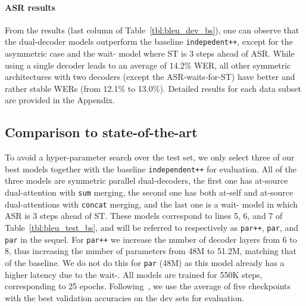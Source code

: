 \documentclass[11pt]{article}
\theoremstyle{plain}
\theoremstyle{definition}
\newcommand{\var}[1]{\texttt{#1}}
\begin{document}
        
    
    
    



\paragraph{ASR results} From the results (last column of Table~\ref{tbl:bleu_dev_bs}), one can observe that the dual-decoder models outperform the baseline \var{indepedent++}, except for the asymmetric case and the wait- model where ST is 3 steps ahead of ASR. While using a single decoder leads to an average of 14.2\% WER, all other symmetric architectures with two decoders (except the ASR-waits-for-ST) have better and rather stable WERs (from 12.1\% to 13.0\%). Detailed results for each data subset are provided in the Appendix.




\subsection{Comparison to state-of-the-art}
\label{section:sota}

To avoid a hyper-parameter search over the test set, we only select three of our best models together with the baseline \var{independent++} for evaluation. All of the three models are symmetric parallel dual-decoders, the first one has at-source dual-attention with \var{sum} merging, the second one has both at-self and at-source dual-attentions with \var{concat} merging, and the last one is a wait- model in which ASR is 3 steps ahead of ST. These models correspond to lines 5, 6, and 7 of Table~\ref{tbl:bleu_test_bs}, and will be referred to respectively as \var{par++}, \var{par}, and \var{par} in the sequel. For \var{par++} we increase the number of decoder layers from 6 to 8, thus increasing the number of parameters from 48M to 51.2M, matching that of the baseline. We do not do this for \var{par} (48M) as this model already has a higher latency due to the wait-. 
All models are trained for 550K steps, corresponding to 25 epochs. 
Following~, we use the average of five checkpoints with the best validation accuracies on the dev sets for evaluation.
\end{document}
